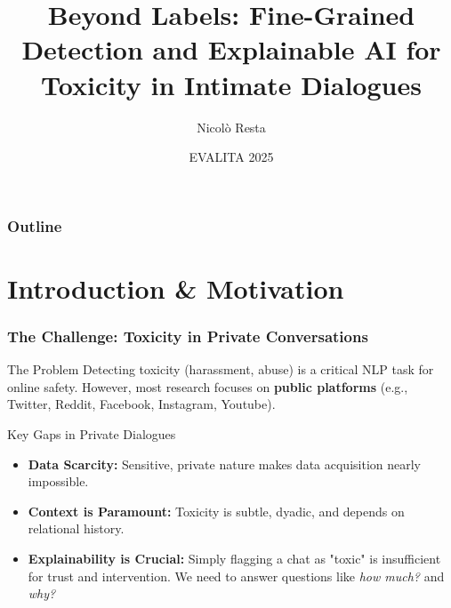 \documentclass[aspectratio=169]{beamer}
\title[Toxicity in Intimate Dialogues]{Beyond Labels: Fine-Grained Detection and Explainable AI for Toxicity in Intimate Dialogues}
\author{Nicolò Resta}
\institute{University of Bari, Aldo Moro}
\date{EVALITA 2025}
\begin{document}
{
  \begin{frame}
    \titlepage
  \end{frame}
}

\begin{frame}
  \frametitle{Outline}
  \tableofcontents
\end{frame}

\section{Introduction \& Motivation}

\begin{frame}
  \frametitle{The Challenge: Toxicity in Private Conversations}
  \begin{block}{The Problem}
        Detecting toxicity (harassment, abuse) is a critical NLP task for online safety.
        However, most research focuses on \textbf{public platforms} (e.g., Twitter, Reddit, Facebook, Instagram, Youtube).
      \end{block}
      
      \begin{alertblock}{Key Gaps in Private Dialogues}
        \begin{itemize}
          \item \textbf{Data Scarcity:} Sensitive, private nature makes data acquisition nearly impossible.
          \item \textbf{Context is Paramount:} Toxicity is subtle, dyadic, and depends on relational history.
          \item \textbf{Explainability is Crucial:} Simply flagging a chat as "toxic" is insufficient for trust and intervention. We need to answer questions like \textit{how much?} and \textit{why?}
        \end{itemize}
      \end{alertblock}
\end{frame}
\end{document}
